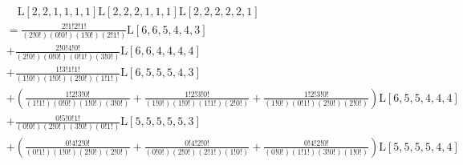 \begin{equation*} \begin{aligned}
& \quad
  \mathrm{L}[2, 2, 1, 1, 1, 1]
  \mathrm{L}[2, 2, 2, 1, 1, 1]
  \mathrm{L}[2, 2, 2, 2, 2, 1] \\ &=
  \frac{2!1!2!1!}{(2!0!)(0!0!)(1!0!)(2!1!)} \mathrm{L}[6,6,5,4,4,3] \\ &
+ \frac{2!0!4!0!}{(2!0!)(0!0!)(0!1!)(3!0!)} \mathrm{L}[6,6,4,4,4,4] \\ &
+ \frac{1!3!1!1!}{(1!0!)(1!0!)(2!0!)(1!1!)} \mathrm{L}[6,5,5,5,4,3] \\ &
+ \left(
  \frac{1!2!3!0!}{(1!1!)(0!0!)(1!0!)(3!0!)}
+ \frac{1!2!3!0!}{(1!0!)(1!0!)(1!1!)(2!0!)}
+ \frac{1!2!3!0!}{(1!0!)(0!1!)(2!0!)(2!0!)}
  \right)
  \mathrm{L}[6,5,5,4,4,4] \\ &
+ \frac{0!5!0!1!}{(0!0!)(2!0!)(3!0!)(0!1!)} \mathrm{L}[5,5,5,5,5,3] \\ &
+ \left(
  \frac{0!4!2!0!}{(0!1!)(1!0!)(2!0!)(2!0!)}
+ \frac{0!4!2!0!}{(0!0!)(2!0!)(2!1!)(1!0!)}
+ \frac{0!4!2!0!}{(0!0!)(1!1!)(3!0!)(1!0!)}
  \right)
  \mathrm{L}[5,5,5,5,4,4] \\
\end{aligned} \end{equation*}